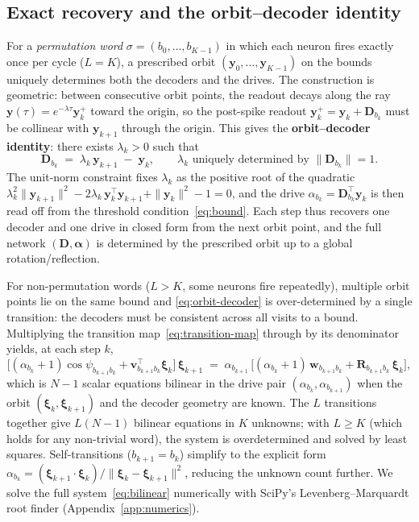 \documentclass[12pt]{article}
\newcommand{\vv}[1]{\mathbf{#1}}
\newcommand{\DD}{\vv{D}}
\newcommand{\yy}{\vv{y}}
\newcommand{\xxi}{\boldsymbol{\xi}}
\begin{document}
\subsection{Exact recovery and the orbit--decoder identity}


For a \emph{permutation word} $\sigma=(b_0,\ldots,b_{K-1})$ in which each neuron fires exactly once per cycle ($L=K$), a prescribed orbit $(\yy_0,\ldots,\yy_{K-1})$ on the bounds uniquely determines both the decoders and the drives. The construction is geometric: between consecutive orbit points, the readout decays along the ray $\yy(\tau)=e^{-\lambda\tau}\yy_k^+$ toward the origin, so the post-spike readout $\yy_k^+=\yy_k+\DD_{b_k}$ must be collinear with $\yy_{k+1}$ through the origin. This gives the \textbf{orbit--decoder identity}: there exists $\lambda_k>0$ such that
\begin{equation}\label{eq:orbit-decoder}
    \;\DD_{b_k} \;=\; \lambda_k\,\yy_{k+1} \;-\; \yy_k,\qquad
        \lambda_k\text{ uniquely determined by }\|\DD_{b_k}\|=1.\;
\end{equation}
The unit-norm constraint fixes $\lambda_k$ as the positive root of the quadratic
$\lambda_k^2\|\yy_{k+1}\|^2 - 2\lambda_k\,\yy_k^\top\yy_{k+1} + \|\yy_k\|^2 - 1 = 0$,
and the drive $\alpha_{b_k}=\DD_{b_k}^\top\yy_k$ is then read off from the threshold condition~\eqref{eq:bound}. Each step thus recovers one decoder and one drive in closed form from the next orbit point, and the full network $(\vv{D},\boldsymbol{\alpha})$ is determined by the prescribed orbit up to a global rotation/reflection.


For non-permutation words ($L>K$, some neurons fire repeatedly), multiple orbit points lie on the same bound and \eqref{eq:orbit-decoder} is over-determined by a single transition: the decoders must be consistent across all visits to a bound. Multiplying the transition map~\eqref{eq:transition-map} through by its denominator yields, at each step $k$,
\begin{equation}\label{eq:bilinear}
    \bigl[(\alpha_{b_k}+1)\cos\psi_{b_{k+1}b_k} + \vv{v}_{b_{k+1}b_k}^\top\xxi_k\bigr]\,\xxi_{k+1}
    \;=\; \alpha_{b_{k+1}}\,\bigl[(\alpha_{b_k}+1)\,\vv{w}_{b_{k+1}b_k} + \vv{R}_{b_{k+1}b_k}\,\xxi_k\bigr],
\end{equation}
which is $N{-}1$ scalar equations bilinear in the drive pair $(\alpha_{b_k},\alpha_{b_{k+1}})$ when the orbit $(\xxi_k,\xxi_{k+1})$ and the decoder geometry are known. The $L$ transitions together give $L(N{-}1)$ bilinear equations in $K$ unknowns; with $L\geq K$ (which holds for any non-trivial word), the system is overdetermined and solved by least squares. Self-transitions ($b_{k+1}=b_k$) simplify to the explicit form $\alpha_{b_k}=(\xxi_{k+1}\!\cdot\!\xxi_k)/\|\xxi_k-\xxi_{k+1}\|^2$, reducing the unknown count further. We solve the full system~\eqref{eq:bilinear} numerically with SciPy's Levenberg--Marquardt root finder (Appendix~\ref{app:numerics}).
\end{document}
